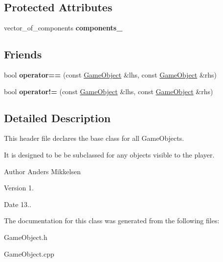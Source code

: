\subsection*{Protected Attributes}
\begin{DoxyCompactItemize}
\item 
\hypertarget{class_game_object_a46fc0e2123b0112a2d1e2d2d4df452cf}{}vector\+\_\+of\+\_\+components {\bfseries components\+\_\+}\label{class_game_object_a46fc0e2123b0112a2d1e2d2d4df452cf}

\end{DoxyCompactItemize}
\subsection*{Friends}
\begin{DoxyCompactItemize}
\item 
\hypertarget{class_game_object_af35fce83d2954152d48746a9f9b2a16d}{}bool {\bfseries operator==} (const \hyperlink{class_game_object}{Game\+Object} \&lhs, const \hyperlink{class_game_object}{Game\+Object} \&rhs)\label{class_game_object_af35fce83d2954152d48746a9f9b2a16d}

\item 
\hypertarget{class_game_object_a0b1778f244697372788e724fee0f776e}{}bool {\bfseries operator!=} (const \hyperlink{class_game_object}{Game\+Object} \&lhs, const \hyperlink{class_game_object}{Game\+Object} \&rhs)\label{class_game_object_a0b1778f244697372788e724fee0f776e}

\end{DoxyCompactItemize}


\subsection{Detailed Description}
This header file declares the base class for all Game\+Objects. 

It is designed to be be subclassed for any objects visible to the player.

\begin{DoxyAuthor}{Author}
Anders Mikkelsen 
\end{DoxyAuthor}
\begin{DoxyVersion}{Version}
1. 
\end{DoxyVersion}
\begin{DoxyDate}{Date}
13.. 
\end{DoxyDate}


The documentation for this class was generated from the following files\+:\begin{DoxyCompactItemize}
\item 
Game\+Object.\+h\item 
Game\+Object.\+cpp\end{DoxyCompactItemize}
